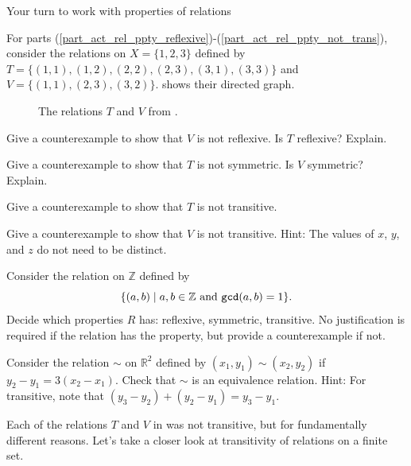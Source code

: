 Your turn to work with properties of relations

\begin{act}
\label{act_ppty_rel}

    For parts (\ref{part_act_rel_ppty_reflexive})-(\ref{part_act_rel_ppty_not_trans}), consider the relations on $X = \{1,2,3\}$ defined by $T = \{(1,1),(1,2), (2,2), (2,3),(3,1),(3,3)\}$ and $V =  \{(1,1), (2,3), (3,2)\}$.  shows their directed graph.
        \begin{figure}[hbtp]
            \centering
            
            \caption{The relations $T$ and $V$ from .}
            \label{fig_TandV}
        \end{figure}
        \begin{actpart}
            \item \label{part_act_rel_ppty_reflexive} Give a counterexample to show that $V$ is not reflexive.  Is $T$ reflexive?  Explain.
            \item Give a counterexample to show that $T$ is not symmetric.  Is $V$ symmetric?  Explain.
            \item Give a counterexample to show that $T$ is not transitive.
            \item \label{part_act_rel_ppty_not_trans}Give a counterexample to show that $V$ is not transitive. Hint: The values of $x$, $y$, and $z$ do not need to be distinct.
            \item Consider the relation on $\mathbb{Z}$ defined by $$\{(a,b) \mid a, b \in \mathbb{Z} \text{ and }\texttt{gcd}(a,b)=1\}.$$  Decide which properties $R$ has: reflexive, symmetric, transitive.  No justification is required if the relation has the property, but provide a counterexample if not.
            \item Consider the relation $\sim$ on $\mathbb{R}^2$ defined by $(x_1,y_1) \sim (x_2,y_2)$ if $y_2-y_1=3(x_2-x_1)$.  Check that $\sim$ is an equivalence relation.  Hint: For transitive, note that $(y_3-y_2)+(y_2-y_1)=y_3-y_1.$
        \end{actpart}
\end{act}

Each of the relations $T$ and $V$ in  was not transitive, but for fundamentally different reasons. Let's take a closer look at transitivity of relations on a finite set.

